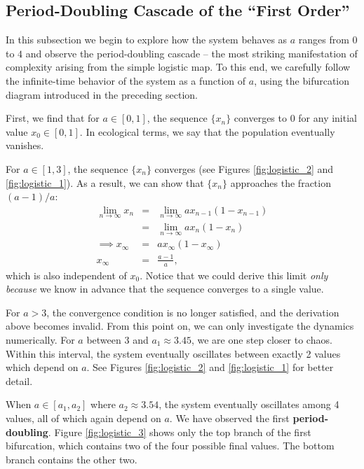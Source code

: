 \documentclass[twocolumn,amsmath,amssymb,aps]{revtex4}
\begin{document}
\subsection{Period-Doubling Cascade of the ``First Order''}

In this subsection we begin to explore how the system behaves as $a$ ranges from $0$ to $4$ and observe the period-doubling cascade -- the most striking manifestation of complexity arising from the simple logistic map. To this end, we carefully follow the infinite-time behavior of the system as a function of $a$, using the bifurcation diagram introduced in the preceding section.

First, we find that for $a\in [0,1]$, the sequence $\{x_n\}$ converges to $0$ for any initial value $x_0\in [0,1]$. In ecological terms, we say that the population eventually vanishes. 

For $a\in [1,3]$, the sequence $\{x_n\}$ converges (see Figures \ref{fig:logistic_2} and \ref{fig:logistic_1}). As a result, we can show that $\{x_n\}$ approaches the fraction $(a-1)/a$:
\begin{eqnarray}
\lim_{n\to \infty} x_{n} &=& \lim_{n\to \infty} ax_{n-1}(1-x_{n-1}) \nonumber \\
&=& \lim_{n\to \infty} ax_{n}(1-x_{n}) \nonumber \\
\implies x_\infty &=& a x_\infty(1-x_\infty) \nonumber \\
x_\infty &=& \frac{a-1}{a} \nonumber,
\end{eqnarray}
which is also independent of $x_0$. Notice that we could derive this limit \textit{only because} we know in advance that the sequence converges to a single value. 

For $a > 3$, the convergence condition is no longer satisfied, and the derivation above becomes invalid. From this point on, we can only investigate the dynamics numerically. For $a$ between $3$ and $a_1 \approx 3.45$, we are one step closer to chaos. Within this interval, the system eventually oscillates between exactly 2 values which depend on $a$. See Figures \ref{fig:logistic_2} and \ref{fig:logistic_1} for better detail.

When $a\in [a_1,a_2]$ where $a_2 \approx 3.54$, the system eventually oscillates among 4 values, all of which again depend on $a$. We have observed the first \textbf{period-doubling}. Figure \ref{fig:logistic_3} shows only the top branch of the first bifurcation, which contains two of the four possible final values. The bottom branch contains the other two. 
\end{document}
